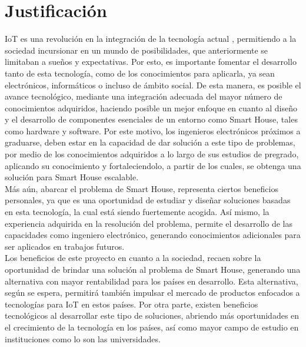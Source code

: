 \chapter{Justificación}

IoT es una revolución en la integración de la tecnología actual \cite{IdT}, permitiendo a la sociedad incursionar en un mundo de posibilidades, que anteriormente se limitaban a  sueños y expectativas. Por esto, es importante fomentar el desarrollo tanto de esta tecnología, como de los conocimientos para aplicarla, ya sean electrónicos, informáticos o incluso de ámbito social. De esta manera, es posible el avance tecnológico, mediante una integración adecuada del mayor número de conocimientos adquiridos, haciendo posible un mejor enfoque en cuanto al diseño y el desarrollo de componentes esenciales de un entorno como Smart House, tales como hardware y software. Por este motivo, los ingenieros electrónicos próximos a graduarse, deben estar en la capacidad de dar solución a este tipo de problemas, por medio de los conocimientos adquiridos a lo largo de sus estudios de pregrado, aplicando su conocimiento y fortaleciendolo, a partir de los cuales, se obtenga una solución para Smart House escalable. \\

Más aún, abarcar el problema de Smart House, representa ciertos beneficios personales, ya que es una oportunidad de estudiar y diseñar soluciones basadas en esta tecnología, la cual está siendo fuertemente acogida. Así mismo, la experiencia adquirida en la resolución del problema, permite el desarrollo de las capacidades como ingeniero electrónico, generando conocimientos adicionales para ser aplicados en trabajos futuros.\\

Los beneficios de este proyecto en cuanto a la sociedad, recaen sobre la oportunidad de brindar una solución al problema de Smart House, generando una alternativa con mayor rentabilidad para los países en desarrollo. Esta alternativa, según se espera, permitirá también impulsar el mercado de productos enfocados a tecnologías para IoT en estos países. Por otra parte, existen beneficios tecnológicos al desarrollar este tipo de soluciones, abriendo más oportunidades en el crecimiento de la tecnología en los países, así como mayor campo de estudio en instituciones como lo son las universidades.\\

